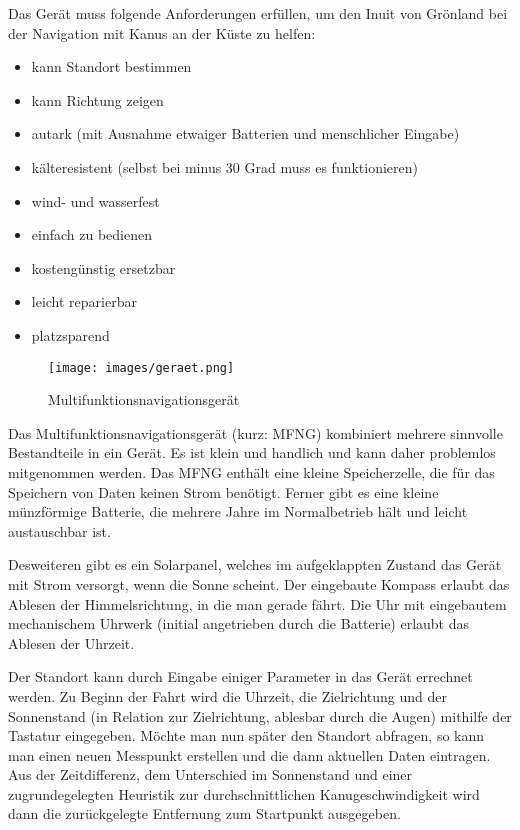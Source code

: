 \documentclass[a4paper,10pt]{scrartcl}
\begin{document}
\kopf
\renewcommand{\figurename}{Figure}


Das Gerät muss folgende Anforderungen erfüllen, um den Inuit von Grönland bei der Navigation mit Kanus an der Küste zu helfen:

\begin{itemize}
	\item kann Standort bestimmen
	\item kann Richtung zeigen
	\item autark (mit Ausnahme etwaiger Batterien und menschlicher Eingabe)
	\item kälteresistent (selbst bei minus 30 Grad muss es funktionieren)
	\item wind- und wasserfest
	\item einfach zu bedienen
	\item kostengünstig ersetzbar
	\item leicht reparierbar
	\item platzsparend
\end{itemize}

	\begin{figure}[H]
		\centering \texttt{[image: images/geraet.png]}
		\caption{Multifunktionsnavigationsgerät}
		\label{fig:wwu_logo}
	\end{figure}


Das Multifunktionsnavigationsgerät (kurz: MFNG) kombiniert mehrere sinnvolle Bestandteile in ein Gerät. Es ist klein und handlich und kann daher problemlos mitgenommen werden. Das MFNG enthält eine kleine Speicherzelle, die für das Speichern von Daten keinen Strom benötigt. Ferner gibt es eine kleine münzförmige Batterie, die mehrere Jahre im Normalbetrieb hält und leicht austauschbar ist.

Desweiteren gibt es ein Solarpanel, welches im aufgeklappten Zustand das Gerät mit Strom versorgt, wenn die Sonne scheint. Der eingebaute Kompass erlaubt das Ablesen der Himmelsrichtung, in die man gerade fährt. Die Uhr mit eingebautem mechanischem Uhrwerk (initial angetrieben durch die Batterie) erlaubt das Ablesen der Uhrzeit.

Der Standort kann durch Eingabe einiger Parameter in das Gerät errechnet werden. Zu Beginn der Fahrt wird die Uhrzeit, die Zielrichtung und der Sonnenstand (in Relation zur Zielrichtung, ablesbar durch die Augen) mithilfe der Tastatur eingegeben. Möchte man nun später den Standort abfragen, so kann man einen neuen Messpunkt erstellen und die dann aktuellen Daten eintragen. Aus der Zeitdifferenz, dem Unterschied im Sonnenstand und einer zugrundegelegten Heuristik zur durchschnittlichen Kanugeschwindigkeit wird dann die zurückgelegte Entfernung zum Startpunkt ausgegeben.
\end{document}
